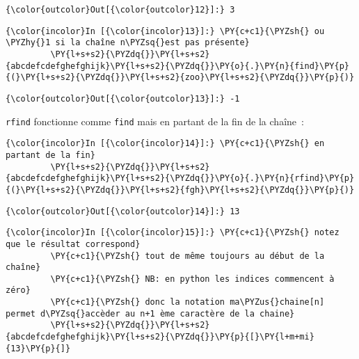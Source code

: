 \begin{Verbatim}[commandchars=\\\{\}]
{\color{outcolor}Out[{\color{outcolor}12}]:} 3
\end{Verbatim}
            
    \begin{Verbatim}[commandchars=\\\{\}]
{\color{incolor}In [{\color{incolor}13}]:} \PY{c+c1}{\PYZsh{} ou \PYZhy{}1 si la chaîne n\PYZsq{}est pas présente}
         \PY{l+s+s2}{\PYZdq{}}\PY{l+s+s2}{abcdefcdefghefghijk}\PY{l+s+s2}{\PYZdq{}}\PY{o}{.}\PY{n}{find}\PY{p}{(}\PY{l+s+s2}{\PYZdq{}}\PY{l+s+s2}{zoo}\PY{l+s+s2}{\PYZdq{}}\PY{p}{)}
\end{Verbatim}


\begin{Verbatim}[commandchars=\\\{\}]
{\color{outcolor}Out[{\color{outcolor}13}]:} -1
\end{Verbatim}
            
    \texttt{rfind} fonctionne comme \texttt{find} mais en partant de la fin
de la chaîne~:

    \begin{Verbatim}[commandchars=\\\{\}]
{\color{incolor}In [{\color{incolor}14}]:} \PY{c+c1}{\PYZsh{} en partant de la fin}
         \PY{l+s+s2}{\PYZdq{}}\PY{l+s+s2}{abcdefcdefghefghijk}\PY{l+s+s2}{\PYZdq{}}\PY{o}{.}\PY{n}{rfind}\PY{p}{(}\PY{l+s+s2}{\PYZdq{}}\PY{l+s+s2}{fgh}\PY{l+s+s2}{\PYZdq{}}\PY{p}{)}
\end{Verbatim}


\begin{Verbatim}[commandchars=\\\{\}]
{\color{outcolor}Out[{\color{outcolor}14}]:} 13
\end{Verbatim}
            
    \begin{Verbatim}[commandchars=\\\{\}]
{\color{incolor}In [{\color{incolor}15}]:} \PY{c+c1}{\PYZsh{} notez que le résultat correspond}
         \PY{c+c1}{\PYZsh{} tout de même toujours au début de la chaîne}
         \PY{c+c1}{\PYZsh{} NB: en python les indices commencent à zéro}
         \PY{c+c1}{\PYZsh{} donc la notation ma\PYZus{}chaine[n] permet d\PYZsq{}accèder au n+1 ème caractère de la chaine}
         \PY{l+s+s2}{\PYZdq{}}\PY{l+s+s2}{abcdefcdefghefghijk}\PY{l+s+s2}{\PYZdq{}}\PY{p}{[}\PY{l+m+mi}{13}\PY{p}{]}
\end{Verbatim}


